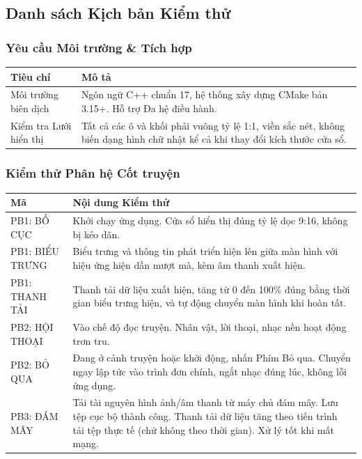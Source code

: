 \documentclass[12pt,a4paper]{article}
\begin{document}
\subsection{Danh sách Kịch bản Kiểm thử}

\subsubsection{Yêu cầu Môi trường \& Tích hợp}
\begin{center}
\begin{adjustbox}{max width=\linewidth}
\begin{tabular}{|p{4.5cm}|p{8.5cm}|}
\hline
{}
\textbf{Tiêu chí} & \textbf{Mô tả} \\ \hline
Môi trường biên dịch & Ngôn ngữ C++ chuẩn 17, hệ thống xây dựng CMake bản 3.15+. Hỗ trợ Đa hệ điều hành. \\ \hline
Kiểm tra Lưới hiển thị & Tất cả các ô và khối phải vuông tỷ lệ 1:1, viền sắc nét, không biến dạng hình chữ nhật kể cả khi thay đổi kích thước cửa sổ. \\ \hline
\end{tabular}
\end{adjustbox}
\end{center}

\subsubsection{Kiểm thử Phân hệ Cốt truyện}
\begin{center}
\begin{adjustbox}{max width=\linewidth}
\begin{tabular}{|p{2.2cm}|p{10.8cm}|}
\hline
\rowcolor{gray!35}
\textbf{Mã} & \textbf{Nội dung Kiểm thử} \\ \hline
PB1: BỐ CỤC & Khởi chạy ứng dụng. Cửa sổ hiển thị đúng tỷ lệ dọc 9:16, không bị kéo dãn. \\ \hline
PB1: BIỂU TRƯNG & Biểu trưng và thông tin phát triển hiện lên giữa màn hình với hiệu ứng hiện dần mượt mà, kèm âm thanh xuất hiện. \\ \hline
PB1: THANH TẢI & Thanh tải dữ liệu xuất hiện, tăng từ 0 đến 100\% đúng bằng thời gian biểu trưng hiện, và tự động chuyển màn hình khi hoàn tất. \\ \hline
PB2: HỘI THOẠI & Vào chế độ đọc truyện. Nhân vật, lời thoại, nhạc nền hoạt động trơn tru. \\ \hline
PB2: BỎ QUA & Đang ở cảnh truyện hoặc khởi động, nhấn Phím Bỏ qua. Chuyển ngay lập tức vào trình đơn chính, ngắt nhạc đúng lúc, không lỗi ứng dụng. \\ \hline
PB3: ĐÁM MÂY & Tải tài nguyên hình ảnh/âm thanh từ máy chủ đám mây. Lưu tệp cục bộ thành công. Thanh tải dữ liệu tăng theo tiến trình tải tệp thực tế (chứ không theo thời gian). Xử lý tốt khi mất mạng. \\ \hline
\end{tabular}
\end{adjustbox}
\end{center}
\end{document}
